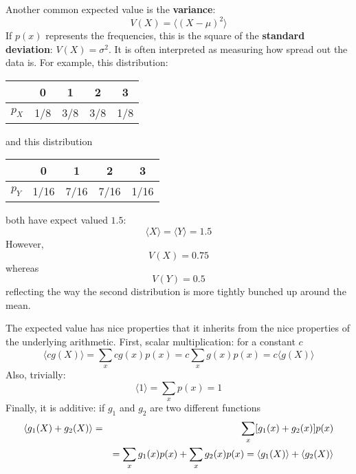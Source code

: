 \documentclass[11pt,a4paper]{scrartcl}
\begin{document}
Another common expected value is the \textbf{variance}:
\begin{equation}
V(X)=\langle (X-\mu)^2\rangle
\end{equation}
If $p(x)$ represents the frequencies, this is the square of the
\textbf{standard deviation}: $V(X)=\sigma^2$. It is often interpreted
as measuring how spread out the data is. For example, this
distribution:
\begin{center}
\begin{tabular}{c|cccc}
&0&1&2&3\\
\hline
$p_X$&1/8&3/8&3/8&1/8
\end{tabular}
\end{center}
and this distribution
\begin{center}
\begin{tabular}{c|cccc}
&0&1&2&3\\
\hline
$p_Y$&1/16&7/16&7/16&1/16
\end{tabular}
\end{center}
both have expect valued $1.5$:
\begin{equation}
\langle X\rangle = \langle Y\rangle = 1.5
\end{equation}
However,
\begin{equation}
V(X)=0.75
\end{equation}
whereas 
\begin{equation}
V(Y)=0.5
\end{equation}
reflecting the way the second distribution is more tightly bunched up
around the mean.

The expected value has nice properties that it inherits from the nice
properties of the underlying arithmetic. First, scalar multiplication:
for a constant $c$
\begin{equation}
\langle c g(X)\rangle =\sum_x cg(x)p(x)=c\sum_x g(x)p(x)=c\langle g(X)\rangle
\end{equation}
Also, trivially:
\begin{equation}
\langle 1\rangle=\sum_x p(x)=1
\end{equation}
Finally, it is additive: if $g_1$ and $g_2$ are two different
functions
\begin{eqnarray}
\langle g_1(X)+g_2(X)\rangle &=&\sum_x [g_1(x)+g_2(x)]p(x)\cr
&&=\sum_x g_1(x)p(x)+\sum_x g_2(x)p(x)=\langle g_1(X)\rangle+\langle g_2(X)\rangle
\end{eqnarray}
\end{document}
